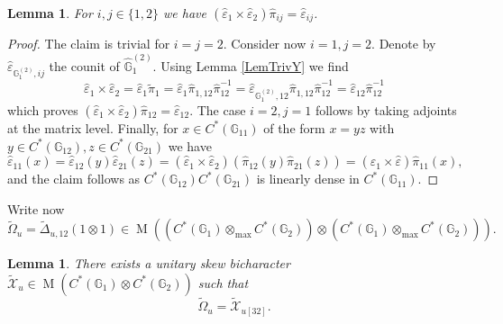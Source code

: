 \documentclass[reqno]{amsart}
\numberwithin{equation}{section}
\newtheorem{Lem}[Theorem]{Lemma}
\newcommand{\G}{\mathbb{G}}
\newcommand{\mcX}{\mathcal{X}}
\newcommand{\eps}{\varepsilon}
\newcommand{\Mult}{\operatorname{M}}
\begin{document}
\begin{Lem}\label{lemma5}
For $i,j\in \{1,2\}$ we have $(\hat{\eps}_1\times \hat{\eps}_2)\hat{\pi}_{ij}=\hat{\eps}_{ij}$.
\end{Lem}

\begin{proof}
The claim is trivial for $i=j=2$. Consider now $i=1,j=2$. Denote by $\hat{\eps}_{\G_1^{(2)},ij}$ the counit of $\hat{\G}_1^{(2)}$. Using Lemma \ref{LemTrivY} we find
\[
\hat{\eps}_1\times \hat{\eps}_2=\hat{\eps}_1\widetilde{\pi}_1=
\hat{\eps}_1 \hat{\pi}_{1,12} \hat{\pi}^{-1}_{12}=
\hat{\eps}_{\G_{1}^{(2)},12} \hat{\pi}_{1,12} \hat{\pi}^{-1}_{12}=
\hat{\eps}_{12}\hat{\pi}^{-1}_{12}
\]
which proves $(\hat{\eps}_1\times \hat{\eps}_2)\hat{\pi}_{12}=\hat{\eps}_{12}$. The case $i=2,j=1$ follows by taking adjoints at  the matrix level. Finally, for $x\in C^*(\G_{11})$ of the form $x=yz$ with $y\in C^*(\G_{12}),z\in C^*(\G_{21})$ we have
\[
\hat{\eps}_{11}(x)=
\hat{\eps}_{12}(y)\hat{\eps}_{21}(z)=
(\hat{\eps}_1\times \hat{\eps}_2)(\hat{\pi}_{12}(y)
\hat{\pi}_{21}(z))=
(\hat{\eps}_1\times \hat{\eps})\hat{\pi}_{11}(x),
\]
and the claim follows as $C^*(\G_{12})C^*(\G_{21})$ is linearly dense in $C^*(\G_{11})$.
\end{proof}

Write now 
\[
\widetilde{\Omega}_u = \widetilde{\Delta}_{u,12}(1\otimes 1) \in \Mult((C^*(\G_1)\otimes_{\max} C^*(\G_2))\otimes (C^*(\G_1)\otimes_{\max} C^*(\G_2))).
\]

\begin{Lem}\label{LemUnitSkewBich}
There exists a unitary skew bicharacter $\widetilde{\mcX}_u \in \Mult(C^*(\G_1) \otimes C^*(\G_2))$ such that 
\[
\widetilde{\Omega}_u = \widetilde{\mcX}_{u[32]}. 
\]
\end{Lem} 
\end{document}
